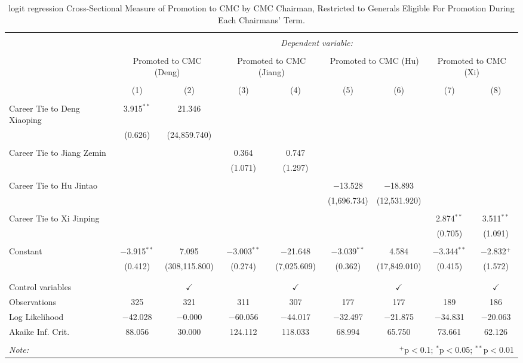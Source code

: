 \documentclass[12pt,letterpaper]{article}
\begin{document}
\begin{table}[!htbp] \centering 
	\caption{logit regression Cross-Sectional Measure of Promotion to CMC by CMC Chairman, Restricted to Generals Eligible For Promotion During Each Chairmans' Term.} 
	\label{table_a19} 
	\begin{tabular}{@{\extracolsep{5pt}}lcccccccc} 
		\\[-1.8ex]\hline 
		\hline \\[-1.8ex] 
		& \multicolumn{8}{c}{\textit{Dependent variable:}} \\ 
		\cline{2-9} 
		\\[-1.8ex] & \multicolumn{2}{c}{Promoted to CMC (Deng)} & \multicolumn{2}{c}{Promoted to CMC (Jiang)} & \multicolumn{2}{c}{Promoted to CMC (Hu)} & \multicolumn{2}{c}{Promoted to CMC (Xi)} \\ 
		\\[-1.8ex] & (1) & (2) & (3) & (4) & (5) & (6) & (7) & (8)\\ 
		\hline \\[-1.8ex] 
		Career Tie to Deng Xiaoping & 3.915$^{**}$ & 21.346 &  &  &  &  &  &  \\ 
		& (0.626) & (24,859.740) &  &  &  &  &  &  \\ 
		& & & & & & & & \\ 
		Career Tie to Jiang Zemin &  &  & 0.364 & 0.747 &  &  &  &  \\ 
		&  &  & (1.071) & (1.297) &  &  &  &  \\ 
		& & & & & & & & \\ 
		Career Tie to Hu Jintao &  &  &  &  & $-$13.528 & $-$18.893 &  &  \\ 
		&  &  &  &  & (1,696.734) & (12,531.920) &  &  \\ 
		& & & & & & & & \\ 
		Career Tie to Xi Jinping &  &  &  &  &  &  & 2.874$^{**}$ & 3.511$^{**}$ \\ 
		&  &  &  &  &  &  & (0.705) & (1.091) \\ 
		& & & & & & & & \\ 
		Constant & $-$3.915$^{**}$ & 7.095 & $-$3.003$^{**}$ & $-$21.648 & $-$3.039$^{**}$ & 4.584 & $-$3.344$^{**}$ & $-$2.832$^{+}$ \\ 
		& (0.412) & (308,115.800) & (0.274) & (7,025.609) & (0.362) & (17,849.010) & (0.415) & (1.572) \\ 
		& & & & & & & & \\ 
		\hline \\[-1.8ex] 
		Control variables &  & $\checkmark$ &  & $\checkmark$ &  & $\checkmark$ &  & $\checkmark$ \\ 
		Observations & 325 & 321 & 311 & 307 & 177 & 177 & 189 & 186 \\ 
		Log Likelihood & $-$42.028 & $-$0.000 & $-$60.056 & $-$44.017 & $-$32.497 & $-$21.875 & $-$34.831 & $-$20.063 \\ 
		Akaike Inf. Crit. & 88.056 & 30.000 & 124.112 & 118.033 & 68.994 & 65.750 & 73.661 & 62.126 \\ 
		\hline 
		\hline \\[-1.8ex] 
		\textit{Note:}  & \multicolumn{8}{r}{$^{+}$p$<$0.1; $^{*}$p$<$0.05; $^{**}$p$<$0.01}} \\ 
\end{tabular} 
\end{table} 
\end{document}
